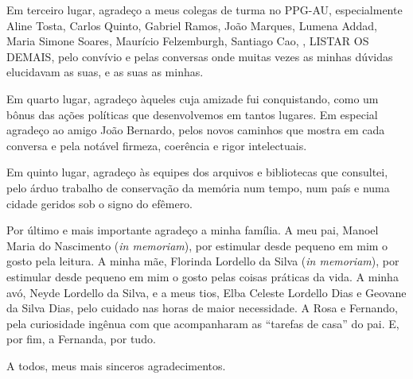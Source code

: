 \begin{agradecimentos}
Em terceiro lugar, agradeço a meus colegas de turma no PPG-AU, especialmente Aline Tosta, Carlos Quinto, Gabriel Ramos, João Marques, Lumena Addad, Maria Simone Soares, Maurício Felzemburgh, Santiago Cao, , LISTAR OS DEMAIS, pelo convívio e pelas conversas onde muitas vezes as minhas dúvidas elucidavam as suas, e as suas as minhas.

Em quarto lugar, agradeço àqueles cuja amizade fui conquistando, como um bônus das ações políticas que desenvolvemos em tantos lugares. Em especial agradeço ao amigo João Bernardo, pelos novos caminhos que mostra em cada conversa e pela notável firmeza, coerência e rigor intelectuais.

Em quinto lugar, agradeço às equipes dos arquivos e bibliotecas que consultei, pelo árduo trabalho de conservação da memória num tempo, num país e numa cidade geridos sob o signo do efêmero.

Por último e mais importante agradeço a minha família. A meu pai, Manoel Maria do Nascimento (\textit{in memoriam}), por estimular desde pequeno em mim o gosto pela leitura. A minha mãe, Florinda Lordello da Silva (\textit{in memoriam}), por estimular desde pequeno em mim o gosto pelas coisas práticas da vida. A minha avó, Neyde Lordello da Silva, e a meus tios, Elba Celeste Lordello Dias e Geovane da Silva Dias, pelo cuidado nas horas de maior necessidade. A Rosa e Fernando, pela curiosidade ingênua com que acompanharam as ``tarefas de casa'' do pai. E, por fim, a Fernanda, por tudo.

A todos, meus mais sinceros agradecimentos.

\end{agradecimentos}
